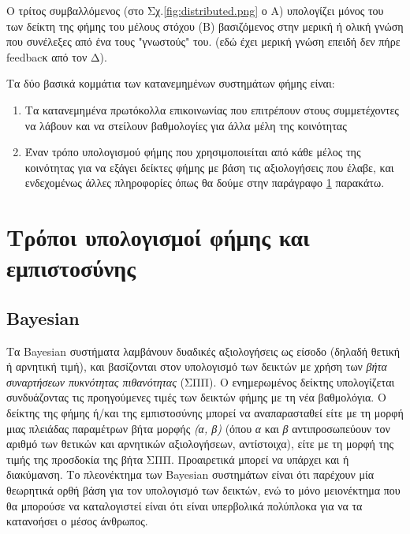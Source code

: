 
Ο τρίτος συμβαλλόμενος (στο Σχ.\ref{fig:distributed.png}  ο Α) υπολογίζει μόνος του των δείκτη της φήμης του μέλους στόχου (Β) βασιζόμενος στην μερική ή ολική γνώση που συνέλεξες από ένα τους "γνωστούς" του. (εδώ έχει μερική γνώση επειδή δεν πήρε feedbacκ από τον Δ).

Τα δύο βασικά κομμάτια των κατανεμημένων συστημάτων φήμης είναι:
\begin{enumerate}

\item Tα κατανεμημένα πρωτόκολλα επικοινωνίας που επιτρέπουν στους συμμετέχοντες να λάβουν και να στείλουν βαθμολογίες για άλλα μέλη της κοινότητας

\item Έναν τρόπο υπολογισμού φήμης που χρησιμοποιείται από κάθε μέλος της κοινότητας για να εξάγει δείκτες φήμης με βάση τις αξιολογήσεις που έλαβε, και ενδεχομένως άλλες πληροφορίες όπως θα δούμε στην παράγραφο \ref{sec:compute} παρακάτω.

\end{enumerate}
\newpage
\section{Τρόποι υπολογισμοί φήμης και εμπιστοσύνης}\label{sec:compute}

\subsection{Bayesian}

Τα Bayesian συστήματα λαμβάνουν δυαδικές αξιολογήσεις ως είσοδο (δηλαδή θετική ή αρνητική τιμή), και βασίζονται στον υπολογισμό των δεικτών  με χρήση των \textit{βήτα συναρτήσεων πυκνότητας πιθανότητας} (ΣΠΠ). Ο  ενημερωμένος δείκτης υπολογίζεται συνδυάζοντας τις προηγούμενες τιμές των δεικτών φήμης με τη νέα βαθμολόγια.%
 Ο δείκτης της φήμης ή/και της εμπιστοσύνης μπορεί να αναπαρασταθεί είτε με τη μορφή μιας πλειάδας παραμέτρων βήτα μορφής \textit{(α, β)} (όπου \textit{α} και \textit{β} αντιπροσωπεύουν τον αριθμό των θετικών και αρνητικών αξιολογήσεων, αντίστοιχα), είτε με τη μορφή της τιμής της προσδοκία της βήτα ΣΠΠ. Προαιρετικά μπορεί να υπάρχει και ή διακύμανση. Το πλεονέκτημα των Bayesian συστημάτων είναι ότι παρέχουν μία θεωρητικά ορθή βάση για τον υπολογισμό των δεικτών, ενώ το μόνο μειονέκτημα που θα μπορούσε να καταλογιστεί είναι ότι είναι υπερβολικά πολύπλοκα για να τα κατανοήσει ο μέσος άνθρωπος.

